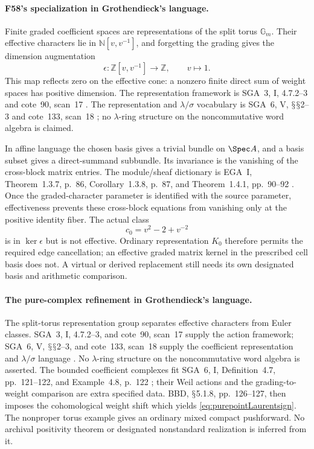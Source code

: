 \documentclass[11pt,a4paper]{article}
\renewcommand{\S}{\ensuremath{\mathsection}}
\newcommand{\fid}[1]{\textsf{#1}}\newcommand{\gate}[1]{\textsf{#1}}
\theoremstyle{named}\newtheorem{finding}{Finding}[section]
\theoremstyle{definition}\newtheorem{definition}[finding]{Definition}
\theoremstyle{remark}\newtheorem{remark}[finding]{Remark}
\begin{document}
\paragraph{\fid{F58}'s specialization in Grothendieck's language.}
Finite graded coefficient spaces are representations
of the split torus \(\mathbb G_m\).
Their effective characters lie in
\(\mathbb N[v,v^{-1}]\), and forgetting the grading gives
the dimension augmentation
\[
\epsilon:\mathbb Z[v,v^{-1}]\longrightarrow\mathbb Z,
\qquad v\longmapsto1.
\]
This map reflects zero on the effective cone:
a nonzero finite direct sum of weight spaces has positive
dimension.
The representation framework is SGA~3,
I, 4.7.2--3 and cote~90, scan~17
\cite{SGA3,Archive}.
The representation and \(\lambda/\sigma\) vocabulary is
SGA~6, V, \S\S2--3 and cote~133, scan~18
\cite{SGA6,Archive};
no \(\lambda\)-ring structure on the noncommutative
word algebra is claimed.

In affine language the chosen basis gives a trivial
bundle on \(\Spec A\), and a basis subset gives a
direct-summand subbundle.
Its invariance is the vanishing of the cross-block
matrix entries.
The module/sheaf dictionary is EGA~I,
Theorem~1.3.7, p.~86, Corollary~1.3.8, p.~87,
and Theorem~1.4.1, pp.~90--92 \cite{EGA}.
Once the graded-character parameter is identified
with the source parameter, effectiveness prevents
these cross-block equations from vanishing only at
the positive identity fiber.
The actual class
\[
c_0=v^2-2+v^{-2}
\]
is in \(\ker\epsilon\) but is not effective.
Ordinary representation \(K_0\) therefore permits
the required edge cancellation; an effective graded
matrix kernel in the prescribed cell basis does not.
A virtual or derived replacement still needs its
own designated basis and arithmetic comparison.

\paragraph{The pure-complex refinement in Grothendieck's language.}
The split-torus representation group separates effective
characters from Euler classes. SGA~3, I, 4.7.2--3,
and cote~90, scan~17 supply the action framework;
SGA~6, V, \S\S2--3, and cote~133, scan~18 supply
the coefficient representation and \(\lambda/\sigma\)
language \cite{SGA3,SGA6,Archive}.
No \(\lambda\)-ring structure on the noncommutative word
algebra is asserted.
The bounded coefficient complexes fit SGA~6,
I, Definition~4.7, pp.~121--122, and Example~4.8,
p.~122 \cite{SGA6}; their Weil actions and the
grading-to-weight comparison are extra specified data.
BBD, \S5.1.8, pp.~126--127, then imposes the
cohomological weight shift which yields
\eqref{eq:purepointLaurentsign}.
The nonproper torus example gives an ordinary mixed
compact pushforward. No archival positivity theorem or
designated nonstandard realization is inferred from it.
\end{document}
